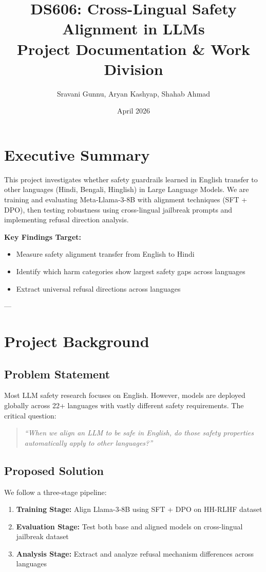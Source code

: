\documentclass[11pt,a4paper]{article}
\title{\textbf{DS606: Cross-Lingual Safety Alignment in LLMs}\\
\Large Project Documentation \& Work Division}
\author{Sravani Gunnu, Aryan Kashyap, Shahab Ahmad}
\date{April 2026}
\begin{document}
\maketitle

\section{Executive Summary}

This project investigates whether safety guardrails learned in English transfer to other languages (Hindi, Bengali, Hinglish) in Large Language Models. We are training and evaluating Meta-Llama-3-8B with alignment techniques (SFT + DPO), then testing robustness using cross-lingual jailbreak prompts and implementing refusal direction analysis.

\textbf{Key Findings Target:}
\begin{itemize}
    \item Measure safety alignment transfer from English to Hindi
    \item Identify which harm categories show largest safety gaps across languages
    \item Extract universal refusal directions across languages
\end{itemize}

---

\section{Project Background}

\subsection{Problem Statement}

Most LLM safety research focuses on English. However, models are deployed globally across 22+ languages with vastly different safety requirements. The critical question:

\begin{quote}
    \textit{``When we align an LLM to be safe in English, do those safety properties automatically apply to other languages?''}
\end{quote}

\subsection{Proposed Solution}

We follow a three-stage pipeline:
\begin{enumerate}
    \item \textbf{Training Stage:} Align Llama-3-8B using SFT + DPO on HH-RLHF dataset
    \item \textbf{Evaluation Stage:} Test both base and aligned models on cross-lingual jailbreak dataset
    \item \textbf{Analysis Stage:} Extract and analyze refusal mechanism differences across languages
\end{enumerate}
\end{document}
